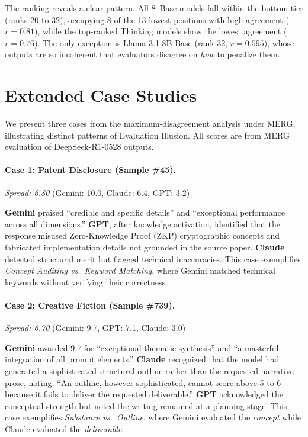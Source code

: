 \documentclass{article}
\begin{document}
The ranking reveals a clear pattern. All 8~Base models fall within the bottom tier (ranks 20 to 32), occupying 8 of the 13 lowest positions with high agreement ($\bar{r} = 0.81$), while the top-ranked Thinking models show the lowest agreement ($\bar{r} = 0.76$). The only exception is Llama-3.1-8B-Base (rank 32, $r = 0.595$), whose outputs are so incoherent that evaluators disagree on \textit{how} to penalize them.


\section{Extended Case Studies}
\label{app:cases}

We present three cases from the maximum-disagreement analysis under MERG, illustrating distinct patterns of Evaluation Illusion. All scores are from MERG evaluation of DeepSeek-R1-0528 outputs.

\paragraph{Case 1: Patent Disclosure (Sample \#45).}
\textit{Spread: 6.80} (Gemini: 10.0, Claude: 6.4, GPT: 3.2)

\textbf{Gemini} praised ``credible and specific details'' and ``exceptional performance across all dimensions.'' \textbf{GPT}, after knowledge activation, identified that the response misused Zero-Knowledge Proof (ZKP) cryptographic concepts and fabricated implementation details not grounded in the source paper. \textbf{Claude} detected structural merit but flagged technical inaccuracies. This case exemplifies \textit{Concept Auditing vs.\ Keyword Matching}, where Gemini matched technical keywords without verifying their correctness.

\paragraph{Case 2: Creative Fiction (Sample \#739).}
\textit{Spread: 6.70} (Gemini: 9.7, GPT: 7.1, Claude: 3.0)

\textbf{Gemini} awarded 9.7 for ``exceptional thematic synthesis'' and ``a masterful integration of all prompt elements.'' \textbf{Claude} recognized that the model had generated a sophisticated structural outline rather than the requested narrative prose, noting: ``An outline, however sophisticated, cannot score above 5 to 6 because it fails to deliver the requested deliverable.'' \textbf{GPT} acknowledged the conceptual strength but noted the writing remained at a planning stage. This case exemplifies \textit{Substance vs.\ Outline}, where Gemini evaluated the \textit{concept} while Claude evaluated the \textit{deliverable}.
\end{document}
